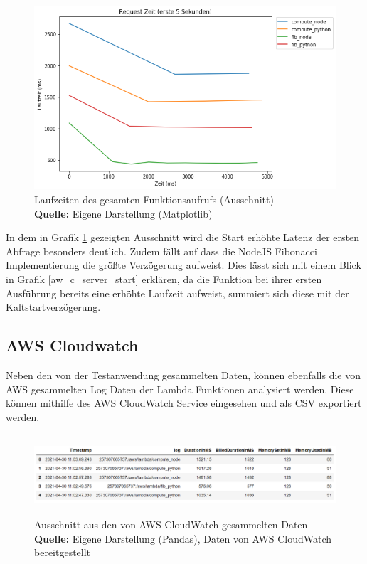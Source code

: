 \documentclass[12pt,a4paper,parskip=half]{scrreprt}
\newcommand*{\captionsource}[2]{%
	\caption[{#1}]{%
		#1%
		\\\hspace{\linewidth}%
		\textbf{Quelle:} #2%
	}%
}
\begin{document}
\FloatBarrier
\begin{figure}[h!]
	\centering
	\includegraphics[scale=0.7]{aw_c_client_start}
	\captionsource{Laufzeiten des gesamten Funktionsaufrufs (Ausschnitt)}
	{Eigene Darstellung (Matplotlib)}
	\label{aw_c_client_start}
\end{figure}
\FloatBarrier

In dem in Grafik \ref{aw_c_client_start} gezeigten Ausschnitt wird die Start erhöhte Latenz der ersten Abfrage besonders deutlich. Zudem fällt auf dass die NodeJS Fibonacci Implementierung die größte Verzögerung aufweist. Dies lässt sich mit einem Blick in Grafik \ref{aw_c_server_start} erklären, da die Funktion bei ihrer ersten Ausführung bereits eine erhöhte Laufzeit aufweist, summiert sich diese mit der Kaltstartverzögerung.

\subsection{AWS Cloudwatch}

Neben den von der Testanwendung gesammelten Daten, können ebenfalls die von AWS gesammelten Log Daten der Lambda Funktionen analysiert werden. Diese können mithilfe des AWS CloudWatch Service eingesehen und als CSV exportiert werden. 

\FloatBarrier
\begin{figure}[h!]
	\centering
	\includegraphics[width=15cm, height=3cm]{CloudWatchDataExample}
	\captionsource{Ausschnitt aus den von AWS CloudWatch gesammelten Daten}
	{Eigene Darstellung (Pandas), Daten von AWS CloudWatch bereitgestellt}
	\label{CloudWatchDFHead}
\end{figure}
\FloatBarrier
\end{document}
